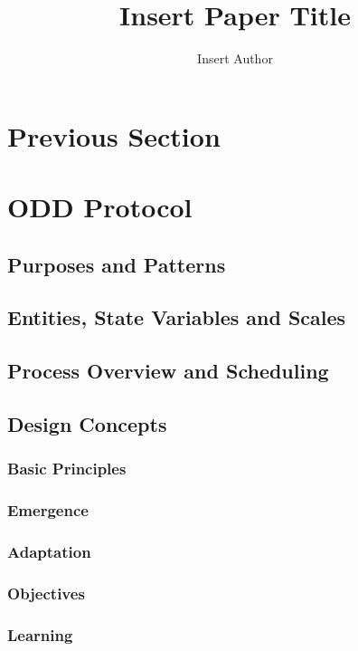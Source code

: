 \documentclass{article}
\title{Insert Paper Title}
\author{Insert Author}
\begin{document}
\maketitle{}

\section{Previous Section}

\section{ODD Protocol}

\subsection{Purposes and Patterns}

\subsection{Entities, State Variables and Scales}

\subsection{Process Overview and Scheduling}

\subsection{Design Concepts}

\subsubsection{Basic Principles}

\subsubsection{Emergence}

\subsubsection{Adaptation}

\subsubsection{Objectives}

\subsubsection{Learning}
\end{document}
